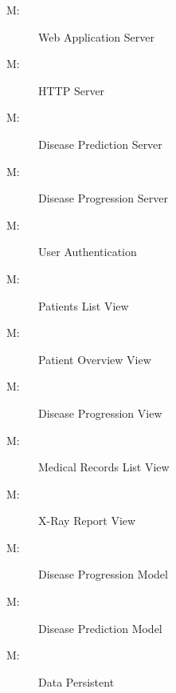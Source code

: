 \documentclass[12pt, titlepage]{article}
\newcounter{mnum}
\newcommand{\mthemnum}{M\themnum}
\begin{document}
\begin{description}
\item [ \mthemnum \label{mWebApp}:] Web Application Server 
\item [ \mthemnum \label{mHTTP}:] HTTP Server 
\item [ \mthemnum \label{mDiseasePredict}:] Disease Prediction Server 
\item [ \mthemnum \label{mDiseaseProgress}:] Disease Progression Server
\item [ \mthemnum \label{mAuth}:] User Authentication 
\item [ \mthemnum \label{mPatientList}:] Patients List View 
\item [ \mthemnum \label{mPatientOverview}:] Patient Overview View 
\item [ \mthemnum \label{mProgressView}:] Disease Progression View 
\item [ \mthemnum \label{mRecordsList}:] Medical Records List View
\item [ \mthemnum \label{mReportView}:] X-Ray Report View
\item [ \mthemnum \label{mProgressModel}:] Disease Progression Model 
\item [ \mthemnum \label{mPredictModel}:] Disease Prediction Model
\item [ \mthemnum \label{mDataStore}:] Data Persistent 
\end{description}
\end{document}
